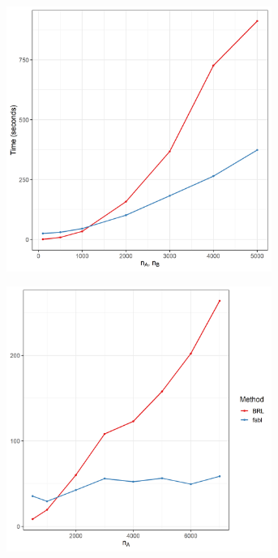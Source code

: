 \documentclass[ba,preprint]{imsart}
\begin{document}
	\begin{figure}[h]
	\centering
	\begin{subfigure}{.5\textwidth}
		\centering
		\includegraphics[width=0.95\textwidth]{../notes/figures/sadinle_speed_plot2_new}
		\caption{}
		\label{fig:app-speed1}
	\end{subfigure}%
	\begin{subfigure}{.5\textwidth}
		\centering
		\includegraphics[width=0.95\textwidth]{../notes/figures/speed_plot_fixed_nB2_new} 

\end{subfigure}
\end{figure}
\end{document}
